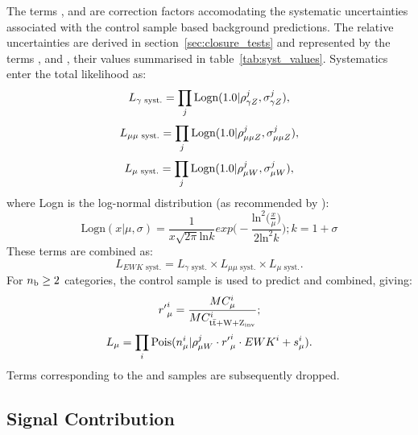 The terms \rhopz, \rhommz and \rhomw are correction factors accomodating the
systematic uncertainties associated with the control sample based background 
predictions. The relative uncertainties are derived in
section~\ref{sec:closure_tests} and represented by the terms \sigmapz, \sigmammz
and \sigmamw, their 
values summarised in table~\ref{tab:syst_values}. Systematics enter the total
likelihood as:
% 
\begin{equation}
L_{\gamma\text{ syst.}} = \prod_j \text{Logn}(1.0 | \rho^j_{\gamma Z}, \sigma^j_{\gamma Z}),
\end{equation}
\begin{equation}
L_{\mu\mu\text{ syst.}} = \prod_j \text{Logn}(1.0 | \rho^j_{\mu\mu Z}, \sigma^j_{\mu\mu Z}),
\end{equation}
\begin{equation}
L_{\mu\text{ syst.}} = \prod_j \text{Logn}(1.0 | \rho^j_{\mu W}, \sigma^j_{\mu W}),
\end{equation}
% 
where Logn is the log-normal distribution (as recommended by \cite{cousins-log-normal}):
% 
\begin{equation}
\text{Logn}(x|\mu, \sigma) = \frac{1}{x\sqrt{2\pi}\text{ln}k} exp \Bigg(-\frac{\text{ln}^2 \big(\frac{x}{\mu}\big)}{2\text{ln}^2k}\Bigg); \xspace k = 1+\sigma
\end{equation}
% 
These terms are combined as:
% 
\begin{equation}
L_{EWK\text{ syst.}} = L_{\gamma\text{ syst.}} \times L_{\mu\mu\text{ syst.}} \times L_{\mu\text{ syst.}}.
\end{equation}
% 
For $n_{\text{b}} \geq 2$ categories, the \mj control sample is used to predict \zinv and
\ttw combined, giving:
% 
\begin{equation}
{r'}^i_{\mu} = \frac{MC_{\mu}^i}{MC^i_{\rm{t}\bar{\rm{t}} + W + Z_{\text{inv}}}};
\end{equation}
% 
\begin{equation}
L_{\mu} = \prod_i \text{Pois}(n_{\mu}^i | \rho^j_{\mu W} \cdot {r'}_{\mu}^i \cdot {EWK}^i + s_{\mu}^i).
\end{equation}
% 
Terms corresponding to the \mmj and \gj samples are subsequently dropped.

\subsection{Signal Contribution}

